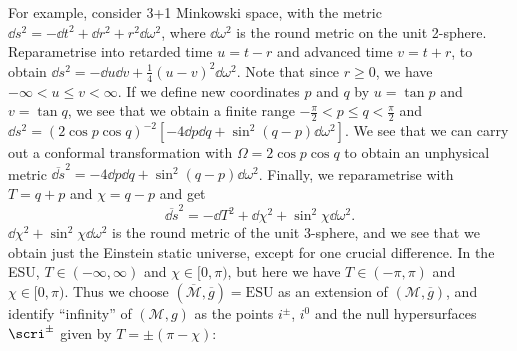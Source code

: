 \documentclass{jknotes}
\begin{document}
For example, consider 3+1 Minkowski space, with the metric \(\dd{s}^2 = -\dd{t}^2 + \dd{r}^2 + r^2\dd{\omega}^2\), where \(\dd{\omega}^2\) is the round metric on the unit 2-sphere. Reparametrise into retarded time \(u = t-r\) and advanced time \(v = t+r\), to obtain \(\dd{s}^2 = -\dd{u}\dd{v} + \frac{1}{4}(u-v)^2\dd{\omega}^2\). Note that since \(r\ge0\), we have \(-\infty < u \le v < \infty\). If we define new coordinates \(p\) and \(q\) by \(u=\tan p\) and \(v=\tan q\), we see that we obtain a finite range \(-\frac{\pi}{2} < p \le q < \frac{\pi}{2}\) and \(\dd{s}^2 = (2\cos p\cos q)^{-2}\left[-4\dd{p}\dd{q}+\sin^2(q-p)\dd{\omega}^2\right]\). We see that we can carry out a conformal transformation with \(\Omega = 2\cos p\cos q\) to obtain an unphysical metric \(\overline{\dd{s}}^2 = -4\dd{p}\dd{q}+\sin^2(q-p)\dd{\omega}^2\). Finally, we reparametrise with \(T=q+p\) and \(\chi=q-p\) and get 
\begin{equation}
    \overline{\dd{s}}^2 = -\dd{T}^2 + \dd{\chi}^2 + \sin^2\chi\dd{\omega}^2.
\end{equation}
\(\dd{\chi}^2 + \sin^2\chi\dd{\omega}^2\) is the round metric of the unit 3-sphere, and we see that we obtain just the Einstein static universe, except for one crucial difference. In the ESU, \(T\in(-\infty,\infty)\) and \(\chi\in[0,\pi)\), but here we have \(T\in(-\pi,\pi)\) and \(\chi\in[0,\pi)\). Thus we choose \((\overline{\mathcal{M}},\overline{g}) = \text{ESU}\) as an extension of \((\mathcal{M},\overline{g})\), and identify ``infinity'' of \((\mathcal{M},g)\) as the points \(i^\pm\), \(i^0\) and the null hypersurfaces \(\scri^\pm\) given by \(T=\pm(\pi-\chi)\):
\end{document}
